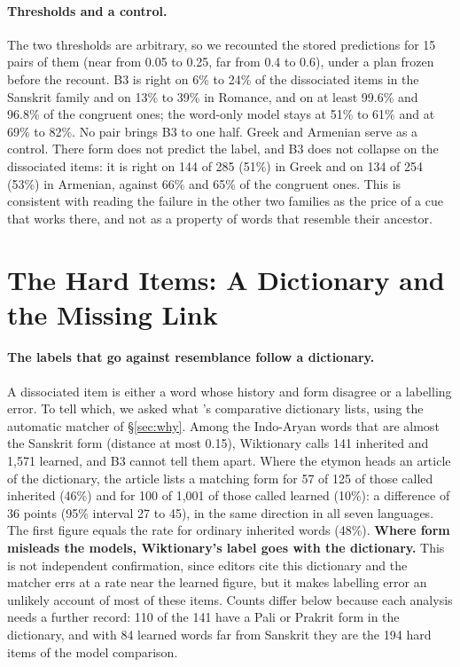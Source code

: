 \documentclass[11pt]{article}
\begin{document}
\paragraph{Thresholds and a control.} The two thresholds are arbitrary, so we recounted the stored predictions for 15 pairs of them (near from 0.05 to 0.25, far from 0.4 to 0.6), under a plan frozen before the recount. B3 is right on 6\% to 24\% of the dissociated items in the Sanskrit family and on 13\% to 39\% in Romance, and on at least 99.6\% and 96.8\% of the congruent ones; the word-only model stays at 51\% to 61\% and at 69\% to 82\%. No pair brings B3 to one half. Greek and Armenian serve as a control. There form does not predict the label, and B3 does not collapse on the dissociated items: it is right on 144 of 285 (51\%) in Greek and on 134 of 254 (53\%) in Armenian, against 66\% and 65\% of the congruent ones. This is consistent with reading the failure in the other two families as the price of a cue that works there, and not as a property of words that resemble their ancestor.

\section{The Hard Items: A Dictionary and the Missing Link}
\label{sec:link}

\paragraph{The labels that go against resemblance follow a dictionary.} A dissociated item is either a word whose history and form disagree or a labelling error. To tell which, we asked what \citeauthor{turner1966cdial}'s comparative dictionary lists, using the automatic matcher of \S\ref{sec:why}. Among the Indo-Aryan words that are almost the Sanskrit form (distance at most 0.15), Wiktionary calls 141 inherited and 1,571 learned, and B3 cannot tell them apart. Where the etymon heads an article of the dictionary, the article lists a matching form for 57 of 125 of those called inherited (46\%) and for 100 of 1,001 of those called learned (10\%): a difference of 36 points (95\% interval 27 to 45), in the same direction in all seven languages. The first figure equals the rate for ordinary inherited words (48\%). \textbf{Where form misleads the models, Wiktionary's label goes with the dictionary.} This is not independent confirmation, since editors cite this dictionary and the matcher errs at a rate near the learned figure, but it makes labelling error an unlikely account of most of these items. Counts differ below because each analysis needs a further record: 110 of the 141 have a Pali or Prakrit form in the dictionary, and with 84 learned words far from Sanskrit they are the 194 hard items of the model comparison.
\end{document}
